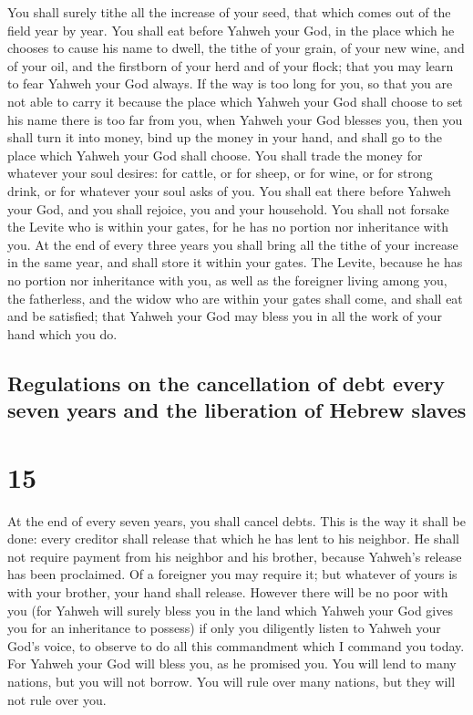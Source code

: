  You shall surely tithe all the increase of your seed,
that which comes out of the field year by year.  You
shall eat before Yahweh your God, in the place which he chooses to cause
his name to dwell, the tithe of your grain, of your new wine, and of
your oil, and the firstborn of your herd and of your flock; that you may
learn to fear Yahweh your God always.  If the way is too
long for you, so that you are not able to carry it because the place
which Yahweh your God shall choose to set his name there is too far from
you, when Yahweh your God blesses you,  then you shall
turn it into money, bind up the money in your hand, and shall go to the
place which Yahweh your God shall choose.  You shall
trade the money for whatever your soul desires: for cattle, or for
sheep, or for wine, or for strong drink, or for whatever your soul asks
of you. You shall eat there before Yahweh your God, and you shall
rejoice, you and your household.  You shall not forsake
the Levite who is within your gates, for he has no portion nor
inheritance with you.  At the end of every three years
you shall bring all the tithe of your increase in the same year, and
shall store it within your gates.  The Levite, because he
has no portion nor inheritance with you, as well as the foreigner living
among you, the fatherless, and the widow who are within your gates shall
come, and shall eat and be satisfied; that Yahweh your God may bless you
in all the work of your hand which you do.

\hypertarget{regulations-on-the-cancellation-of-debt-every-seven-years-and-the-liberation-of-hebrew-slaves}{%
\subsection{Regulations on the cancellation of debt every seven years
and the liberation of Hebrew
slaves}\label{regulations-on-the-cancellation-of-debt-every-seven-years-and-the-liberation-of-hebrew-slaves}}

\hypertarget{section-14}{%
\section{15}\label{section-14}}

 At the end of every seven years, you shall cancel debts.
 This is the way it shall be done: every creditor shall
release that which he has lent to his neighbor. He shall not require
payment from his neighbor and his brother, because Yahweh's release has
been proclaimed.  Of a foreigner you may require it; but
whatever of yours is with your brother, your hand shall release.
 However there will be no poor with you (for Yahweh will
surely bless you in the land which Yahweh your God gives you for an
inheritance to possess)  if only you diligently listen to
Yahweh your God's voice, to observe to do all this commandment which I
command you today.  For Yahweh your God will bless you, as
he promised you. You will lend to many nations, but you will not borrow.
You will rule over many nations, but they will not rule over you.

